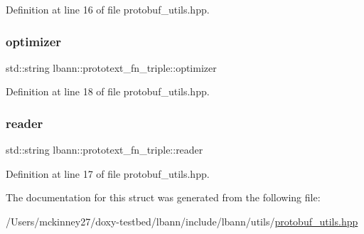 Definition at line 16 of file protobuf\+\_\+utils.\+hpp.

\mbox{\label{structlbann_1_1prototext__fn__triple_a223cbc06d9f15e322a3472b991137be4}} 
\subsubsection{\texorpdfstring{optimizer}{optimizer}}
{\footnotesize\ttfamily std\+::string lbann\+::prototext\+\_\+fn\+\_\+triple\+::optimizer}



Definition at line 18 of file protobuf\+\_\+utils.\+hpp.

\mbox{\label{structlbann_1_1prototext__fn__triple_a6b8674014fe4a2ba4a0eb4eff4e927ed}} 
\subsubsection{\texorpdfstring{reader}{reader}}
{\footnotesize\ttfamily std\+::string lbann\+::prototext\+\_\+fn\+\_\+triple\+::reader}



Definition at line 17 of file protobuf\+\_\+utils.\+hpp.



The documentation for this struct was generated from the following file\+:\begin{DoxyCompactItemize}
\item 
/\+Users/mckinney27/doxy-\/testbed/lbann/include/lbann/utils/\hyperlink{protobuf__utils_8hpp}{protobuf\+\_\+utils.\+hpp}\end{DoxyCompactItemize}
